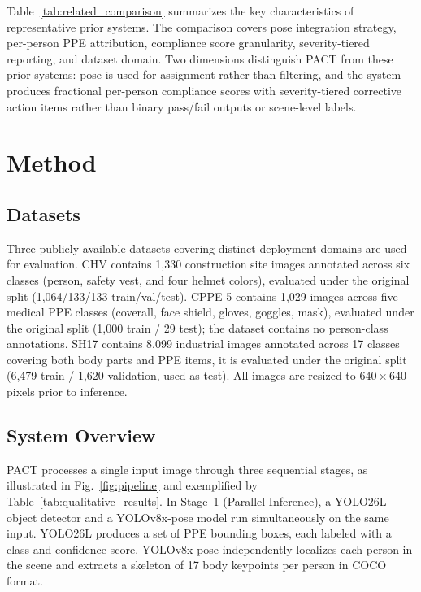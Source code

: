 \documentclass[conference]{IEEEtran}
\begin{document}
Table~\ref{tab:related_comparison} summarizes the key characteristics of representative prior systems. The comparison covers pose integration strategy, per-person PPE attribution, compliance score granularity, severity-tiered reporting, and dataset domain. Two dimensions distinguish PACT from these prior systems: pose is used for assignment rather than filtering, and the system produces fractional per-person compliance scores with severity-tiered corrective action items rather than binary pass/fail outputs or scene-level labels.



\section{Method}


\subsection{Datasets}
Three publicly available datasets covering distinct deployment domains are used for evaluation. CHV \cite{ref5} contains 1,330 construction site images annotated across six classes (person, safety vest, and four helmet colors), evaluated under the original split (1,064/133/133 train/val/test). CPPE-5 \cite{ref1} contains 1,029 images across five medical PPE classes (coverall, face shield, gloves, goggles, mask), evaluated under the original split (1,000 train / 29 test); the dataset contains no person-class annotations. SH17 \cite{ref2} contains 8,099 industrial images annotated across 17 classes covering both body parts and PPE items, it is evaluated under the original split (6,479 train / 1,620 validation, used as test). All images are resized to $640 \times 640$ pixels prior to inference.


\subsection{System Overview}
PACT processes a single input image through three sequential stages, as illustrated in Fig.~\ref{fig:pipeline} and exemplified by Table~\ref{tab:qualitative_results}. In Stage~1 (Parallel Inference), a YOLO26L object detector and a YOLOv8x-pose model run simultaneously on the same input. YOLO26L produces a set of PPE bounding boxes, each labeled with a class and confidence score. YOLOv8x-pose independently localizes each person in the scene and extracts a skeleton of 17 body keypoints per person in COCO format.
\end{document}
